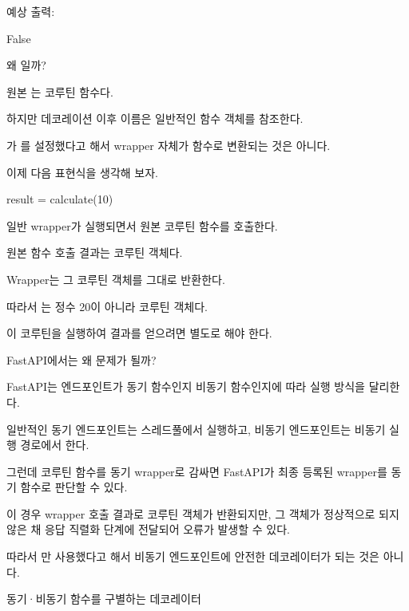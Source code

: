 예상 출력:

\begin{dhkzsh}
False
\end{dhkzsh}

왜 일까?

원본 는 코루틴 함수다.

하지만 데코레이션 이후  이름은 일반적인  함수 객체를 참조한다.

가 를 설정했다고 해서 wrapper 자체가  함수로 변환되는 것은 아니다.

이제 다음 표현식을 생각해 보자.

\begin{dhkcode}
result = calculate(10)
\end{dhkcode}

일반 wrapper가 실행되면서 원본 코루틴 함수를 호출한다.

원본 함수 호출 결과는 코루틴 객체다.

Wrapper는 그 코루틴 객체를 그대로 반환한다.

따라서 는 정수 20이 아니라 코루틴 객체다.

이 코루틴을 실행하여 결과를 얻으려면 별도로  해야 한다.

\begin{dhknote}
\begin{dhksmry}[centered]
FastAPI에서는 왜 문제가 될까?
\end{dhksmry}
\end{dhknote}

FastAPI는 엔드포인트가 동기 함수인지 비동기 함수인지에 따라 실행 방식을 달리한다.

일반적인 동기 엔드포인트는 스레드풀에서 실행하고, 비동기 엔드포인트는 비동기 실행 경로에서 한다.

그런데 코루틴 함수를 동기 wrapper로 감싸면 FastAPI가 최종 등록된 wrapper를 동기 함수로 판단할 수 있다.

이 경우 wrapper 호출 결과로 코루틴 객체가 반환되지만, 그 객체가 정상적으로  되지 않은 채 응답 직렬화 단계에 전달되어 오류가 발생할 수 있다.

따라서 만 사용했다고 해서 비동기 엔드포인트에 안전한 데코레이터가 되는 것은 아니다.

\begin{dhknote}
\begin{dhksmry}[centered]
동기·비동기 함수를 구별하는 데코레이터
\end{dhksmry}
\end{dhknote}

